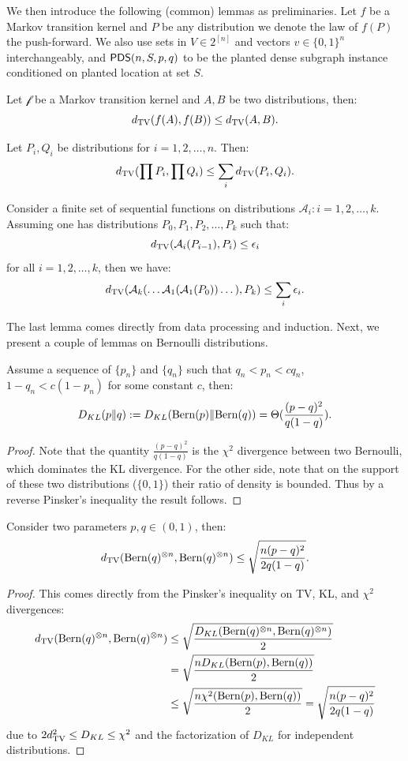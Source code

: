 \documentclass[final,12pt]{colt2023} %
\newcommand\1[1]{\mathbb{I}_{\left\{#1\right\}}}
\begin{document}
\spac We then introduce the following (common) lemmas as preliminaries. Let $f$ be a Markov transition kernel and $P$ be any distribution we denote the law of $f(P)$ the push-forward. We also use sets in $V\in 2^{[n]}$ and vectors $v\in \{0,1\}^{n}$ interchangeably, and $\mathsf{PDS}(n, S, p, q)$ to be the planted dense subgraph instance conditioned on planted location at set $S$.
\begin{lemma} Let $\mathcal{f}$ be a Markov transition kernel and $A, B$ be two distributions, then:
$$d_{\rm TV}(f(A), f(B))\leq d_{\rm TV}(A, B).$$
\end{lemma}
\begin{lemma}[Tensorization of TV] \label{Tensor}
Let $P_i, Q_i$ be distributions for $i=1,2,\dots, n$. Then:
$$d_{\rm TV}(\prod P_i, \prod Q_i)\leq \sum_i d_{\rm TV}(P_i, Q_i).$$
\end{lemma}
\begin{lemma}\label{TVACC}
Consider a finite set of sequential functions on distributions $\mathcal{A}_i: i=1,2,\dots, k$. Assuming one has distributions $P_0,P_1, P_2,\dots, P_k$ such that:
$$d_{\rm TV}(\mathcal{A}_i(P_{i-1}), P_i)\leq \epsilon_i$$ for all $i=1,2,\dots, k$, then we have:
$$d_{\rm TV}(\mathcal{A}_{k}(\dots\mathcal{A}_1(\mathcal{A}_1(P_0))\dots), P_k)\leq \sum_i\epsilon_i.$$
\end{lemma}
The last lemma comes directly from data processing and induction. Next, we present a couple of lemmas on Bernoulli distributions.

\begin{lemma}\label{KLAPPROX}
Assume a sequence of $\{p_n\}$ and $\{q_n\}$ such that $q_n<p_n<cq_n$, $1-q_n<c(1-p_n)$ for some constant $c$, then:
$$D_{KL}(p\|q):=D_{KL}({\rm Bern}(p)\|{\rm Bern}(q))=\Theta(\frac{(p-q)^2}{q(1-q)}).$$
\end{lemma}
\begin{proof}
Note that the quantity $\frac{(p-q)^2}{q(1-q)}$ is the $\chi^2$ divergence between two Bernoulli, which dominates the KL divergence. For the other side, note that on the support of these two distributions ($\{0,1\}$) their ratio of density is bounded. Thus by a reverse Pinsker's inequality the result follows. 
\end{proof}
\begin{lemma}\label{TVBIN}
Consider two parameters $p, q\in(0,1)$, then:
$$d_{\rm TV}({\rm Bern}(q)^{\otimes n}, {\rm Bern}(q)^{\otimes n})\leq \sqrt{\frac{n(p-q)^2}{2q(1-q)}}.$$
\end{lemma}
\begin{proof}
This comes directly from the Pinsker's inequality on TV, KL, and $\chi^2$ divergences:
\begin{align*}
    d_{\rm TV}({\rm Bern}(q)^{\otimes n}, {\rm Bern}(q)^{\otimes n})&\leq \sqrt{\frac{D_{KL}({\rm Bern}(q)^{\otimes n},{\rm Bern}(q)^{\otimes n})}{2}} \\
    &=\sqrt{\frac{nD_{KL}({\rm Bern}(p), {\rm Bern}(q))}{2}}
    \\&\leq \sqrt{\frac{n\chi^2({\rm Bern}(p), {\rm Bern}(q))}{2}}=\sqrt{\frac{n(p-q)^2}{2q(1-q)}}
\end{align*} due to $2d_{\rm TV}^2\leq D_{KL}\leq \chi^2$ and the factorization of $D_{KL}$ for independent distributions.\end{proof}
\end{document}
